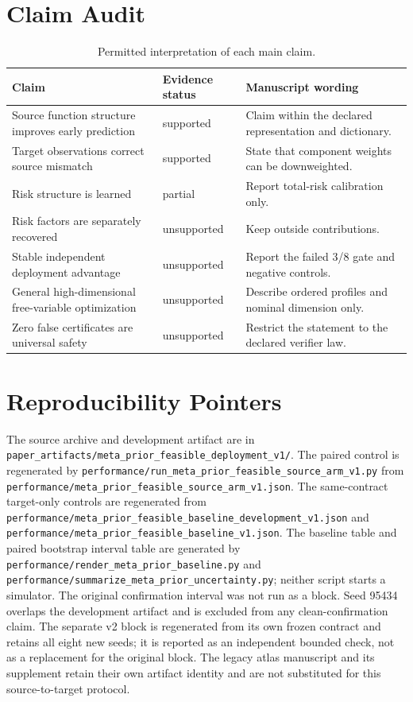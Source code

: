 \documentclass[opre,dblanonrev]{informs4}
\begin{document}
\section{Claim Audit}

\begin{table}[h]
\centering
\caption{Permitted interpretation of each main claim.}
\label{tab:mp_claim_audit}
\begin{tabular}{p{}p{}p{}}
\toprule
Claim & Evidence status & Manuscript wording\\
\midrule
Source function structure improves early prediction & supported & Claim within the declared representation and dictionary.\\
Target observations correct source mismatch & supported & State that component weights can be downweighted.\\
Risk structure is learned & partial & Report total-risk calibration only.\\
Risk factors are separately recovered & unsupported & Keep outside contributions.\\
Stable independent deployment advantage & unsupported & Report the failed 3/8 gate and negative controls.\\
General high-dimensional free-variable optimization & unsupported & Describe ordered profiles and nominal dimension only.\\
Zero false certificates are universal safety & unsupported & Restrict the statement to the declared verifier law.\\
\bottomrule
\end{tabular}
\end{table}

\section{Reproducibility Pointers}

The source archive and development artifact are in
\texttt{paper\_artifacts/}\allowbreak\texttt{meta\_prior\_feasible\_deployment\_v1/}.
The paired control is regenerated by
\texttt{performance/}\allowbreak\texttt{run\_meta\_prior\_feasible\_source\_arm\_v1.py}
from \texttt{performance/}\allowbreak\texttt{meta\_prior\_feasible\_source\_arm\_v1.json}.
The same-contract target-only controls are regenerated from
\texttt{performance/}\allowbreak\texttt{meta\_prior\_feasible\_baseline\_development\_v1.json}
and \texttt{performance/}\allowbreak\texttt{meta\_prior\_feasible\_baseline\_v1.json}.
The baseline table and paired bootstrap interval table are generated by
\texttt{performance/render\_meta\_prior\_baseline.py} and
\texttt{performance/summarize\_meta\_prior\_uncertainty.py}; neither script
starts a simulator.
The original confirmation interval was not run as a block.  Seed 95434 overlaps
the development artifact and is excluded from any clean-confirmation claim.
The separate v2 block is regenerated from its own
frozen contract and retains all eight new seeds; it is reported as an
independent bounded check, not as a replacement for the original block.  The
legacy atlas manuscript and its supplement retain their own artifact identity
and are not substituted for this source-to-target protocol.
\end{document}
